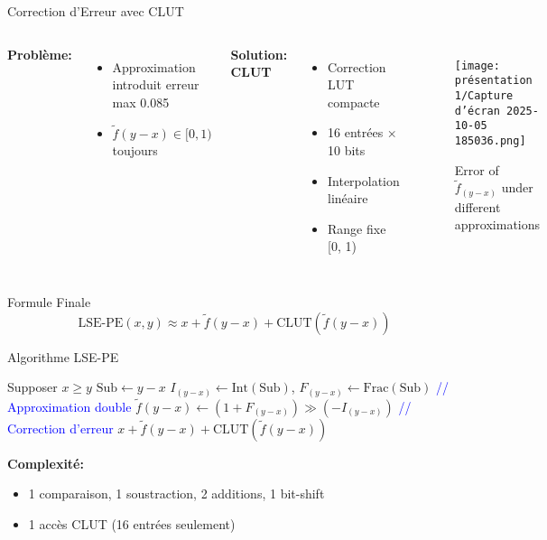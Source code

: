 \documentclass[aspectratio=169]{beamer}
\begin{document}
\begin{frame}{Correction d'Erreur avec CLUT}
\begin{columns}
\textbf{Problème:}
\begin{itemize}
\item Approximation introduit erreur max 0.085
\item $\tilde{f}(y-x) \in [0, 1)$ toujours
\end{itemize}

\vspace{0.3cm}
\textbf{Solution: CLUT}
\begin{itemize}
\item Correction LUT compacte
\item 16 entrées × 10 bits
\item Interpolation linéaire
\item Range fixe [0, 1)
\end{itemize}

\begin{figure}
    \centering
    \texttt{[image: présentation 1/Capture d’écran 2025-10-05 185036.png]}
    \caption{Error of $\tilde{f}_{(y−x)}$ under different approximations}
   \label{fig:tilde-error}
\end{figure}
\end{columns}

\begin{block}{Formule Finale}
\[
\text{LSE-PE}(x, y) \approx x + \tilde{f}(y-x) + \text{CLUT}(\tilde{f}(y-x))
\]
\end{block}
\end{frame}

\begin{frame}[fragile]{Algorithme LSE-PE}
\begin{algorithmic}[1]
\State Supposer $x \geq y$
\State $\text{Sub} \gets y - x$
\State $I_{(y-x)} \gets \text{Int}(\text{Sub})$, $F_{(y-x)} \gets \text{Frac}(\text{Sub})$
\State
\State \textcolor{blue}{// Approximation double}
\State $\tilde{f}(y-x) \gets (1 + F_{(y-x)}) \gg (-I_{(y-x)})$
\State
\State \textcolor{blue}{// Correction d'erreur}
\State \Return $x + \tilde{f}(y-x) + \text{CLUT}(\tilde{f}(y-x))$
\EndFunction
\end{algorithmic}

\vspace{0.5cm}
\textbf{Complexité:} 
\begin{itemize}
\item 1 comparaison, 1 soustraction, 2 additions, 1 bit-shift
\item 1 accès CLUT (16 entrées seulement)
\end{itemize}
\end{frame}
\end{document}
